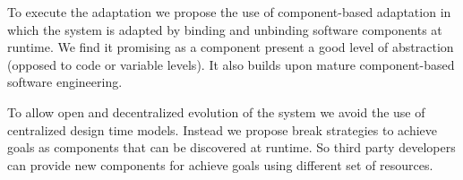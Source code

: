 To execute the adaptation we propose the use of component-based adaptation in which the system is adapted by binding and unbinding software components at runtime. We find it promising as a component present a good level of abstraction (opposed to code or variable levels). It also builds upon mature component-based software engineering.

To allow open and decentralized evolution of the system we avoid the use of centralized design time models. Instead we propose break strategies to achieve goals as components that can be discovered at runtime. So third party developers can provide new components for achieve goals using different set of resources.

